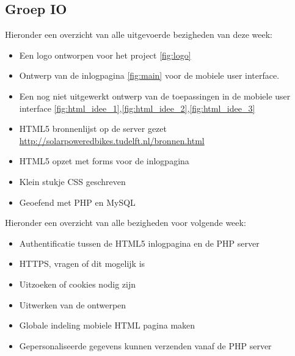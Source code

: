 \subsection*{Groep IO}

Hieronder een overzicht van alle uitgevoerde bezigheden van deze week:

\begin{itemize}

\item
Een logo ontworpen voor het project \ref{fig:logo}

\item
Ontwerp van de inlogpagina \ref{fig:main} voor de mobiele user interface.

\item
Een nog niet uitgewerkt ontwerp van de toepassingen in de mobiele user interface \ref{fig:html_idee_1},\ref{fig:html_idee_2},\ref{fig:html_idee_3}

\item
HTML5 bronnenlijst op de server gezet \url{http://solarpoweredbikes.tudelft.nl/bronnen.html}

\item
HTML5 opzet met forms voor de inlogpagina

\item
Klein stukje CSS geschreven

\item
Geoefend met PHP en MySQL

\end{itemize}

\noindent
Hieronder een overzicht van alle bezigheden voor volgende week:

\begin{itemize}

\item
Authentificatie tussen de HTML5 inlogpagina en de PHP server

\item
HTTPS, vragen of dit mogelijk is

\item
Uitzoeken of cookies nodig zijn

\item
Uitwerken van de ontwerpen

\item
Globale indeling mobiele HTML pagina maken

\item
Gepersonaliseerde gegevens kunnen verzenden vanaf de PHP server



\end{itemize}


